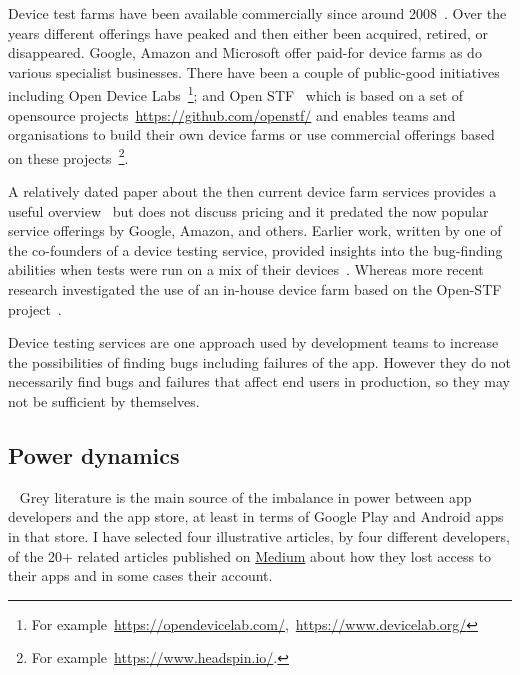 Device test farms have been available commercially since around 2008~. Over the years different offerings have peaked and then either been acquired, retired, or disappeared. Google, Amazon and Microsoft offer paid-for device farms as do various specialist businesses. There have been a couple of public-good initiatives including Open Device Labs~\footnote{For example~\url{https://opendevicelab.com/},~\url{https://www.devicelab.org/}}; and Open STF~ which is based on a set of opensource projects~\url{https://github.com/openstf/} and enables teams and organisations to build their own device farms or use commercial offerings based on these projects~\footnote{For example~\url{https://www.headspin.io/}.}.

A relatively dated paper about the then current device farm services provides a useful overview~ but does not discuss pricing and it predated the now popular service offerings by Google, Amazon, and others. Earlier work, written by one of the co-founders of a device testing service, provided insights into the bug-finding abilities when tests were run on a mix of their devices~. Whereas more recent research investigated the use of an in-house device farm based on the Open-STF project~. 

Device testing services are one approach used by development teams to increase the possibilities of finding bugs including failures of the app. However they do not necessarily find bugs and failures that affect end users in production, so they may not be sufficient by themselves.


\subsection{Power dynamics}~\label{rw-power-dynamics-topic}
Grey literature is the main source of the imbalance in power between app developers and the app store, at least in terms of Google Play and Android apps in that store. I have selected four illustrative articles, by four different developers, of the 20+ related articles published on \href{https://medium.com/}{Medium} %
about how they lost access to their apps and in some cases their account. 

